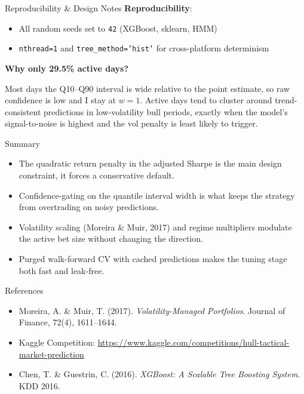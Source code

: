 \documentclass[aspectratio=169]{beamer}
\begin{document}
\begin{frame}{Reproducibility \& Design Notes}
\textbf{Reproducibility}:
\begin{itemize}
    \item All random seeds set to \texttt{42} (XGBoost, sklearn, HMM)
    \item \texttt{nthread=1} and \texttt{tree\_method='hist'} for cross-platform determinism
\end{itemize}
\vspace{0.3cm}
\textbf{Why only 29.5\% active days?}

Most days the Q10--Q90 interval is wide relative to the point estimate, so raw confidence is low and I stay at $w = 1$. Active days tend to cluster around trend-consistent predictions in low-volatility bull periods, exactly when the model's signal-to-noise is highest and the vol penalty is least likely to trigger.
\end{frame}

\begin{frame}{Summary}
\begin{itemize}
    \item The quadratic return penalty in the adjusted Sharpe is the main design constraint, it forces a conservative default.
    \item Confidence-gating on the quantile interval width is what keeps the strategy from overtrading on noisy predictions.
    \item Volatility scaling (Moreira \& Muir, 2017) and regime multipliers modulate the active bet size without changing the direction.
    \item Purged walk-forward CV with cached predictions makes the tuning stage both fast and leak-free.
\end{itemize}
\end{frame}

\begin{frame}{References}
\begin{itemize}
    \item Moreira, A. \& Muir, T. (2017). \textit{Volatility-Managed Portfolios}. Journal of Finance, 72(4), 1611--1644.
    \item Kaggle Competition: \url{https://www.kaggle.com/competitions/hull-tactical-market-prediction}
    \item Chen, T. \& Guestrin, C. (2016). \textit{XGBoost: A Scalable Tree Boosting System}. KDD 2016.
\end{itemize}
\end{frame}
\end{document}
